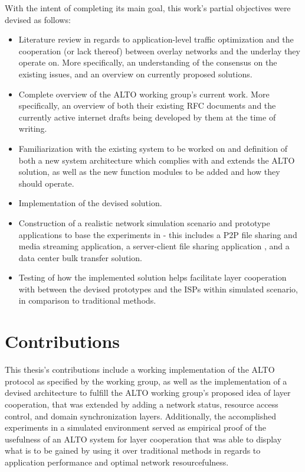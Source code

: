     With the intent of completing its main goal, this work's partial objectives were devised as follows:

\begin{itemize}
    \item Literature review in regards to application-level traffic optimization and the cooperation (or lack thereof) between overlay networks and the underlay they operate on.
        More specifically, an understanding of the consensus on the existing issues, and an overview on currently proposed solutions.
    \item Complete overview of the ALTO working group's current work.
        More specifically, an overview of both their existing RFC documents and the currently active internet drafts being developed by them at the time of writing.
    \item Familiarization with the existing system to be worked on and definition of both a new system architecture which complies with and extends the ALTO solution, as well as the new function modules to be added and how they should operate.
    \item Implementation of the devised solution.
    \item Construction of a realistic network simulation scenario and prototype applications to base the experiments in - this includes a P2P file sharing and media streaming application, a server-client file sharing application , and a data center bulk transfer solution.
    \item Testing of how the implemented solution helps facilitate layer cooperation with between the devised prototypes and the ISPs within simulated scenario, in comparison to traditional methods.
\end{itemize}

\section{Contributions}

    This thesis's contributions include a working implementation of the ALTO protocol as specified by the working group, as well as the implementation of a devised architecture to fulfill the ALTO working group's proposed idea of layer cooperation, that was extended by adding a network status, resource access control, and domain synchronization layers.
    Additionally, the accomplished experiments in a simulated environment served as empirical proof of the usefulness of an ALTO system for layer cooperation that was able to display what is to be gained by using it over traditional methods in regards to application performance and optimal network resourcefulness.

